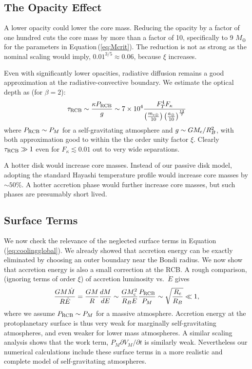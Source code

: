 \documentclass[apj]{emulateapj}
\newcommand{\p}{\partial}
\newcommand{\Eq}[1]{Equation\,(\ref{#1})}
\newcommand{\co}{_{\rm c}}
\newcommand{\cb}{_{\rm RCB}}
\newcommand{\surf}{_M}
\newcommand{\mc}{m_{\rm c \oplus}}
\newcommand{\au}{a_\oplus}
\begin{document}
\subsection{The Opacity Effect}
A  lower opacity  could lower the core mass.  Reducing the opacity by a factor of one hundred cuts the core mass by more than a factor of 10, specifically to 9 $M_\oplus$ for the parameters in \Eq{eq:Mcrit}.  The reduction is not  as strong as the nominal scaling would imply, $0.01^{3/5} \approx 0.06$, because $\xi$ increases.

Even with significantly lower opacities, radiative diffusion remains a good approximation at the radiative-convective boundary.  We estimate the optical depth as (for $\beta = 2$):
\begin{equation}
\tau\cb \sim {\kappa P\cb \over g} \sim 7 \times 10^4 {F_T^4 F_\kappa \over \left(\mc \over 10 \right) \left(\au \over 10\right)^{12 \over 7}} 
\end{equation} 
where $P\cb \sim P_M$ for a self-gravitating atmosphere and $g \sim G M\co/R_B^2$, with both approximation good to within the the order unity factor $\xi$.  Clearly $\tau\cb \gg 1$ even for $F_\kappa \lesssim 0.01$ out to very wide separations.

A hotter disk would increase core masses.  Instead of our passive disk model, adopting the standard Hayashi temperature profile would increase core masses by $\sim 50\%$.  A hotter accretion phase would further increase core masses, but such phases are presumably short lived.

\subsection{Surface Terms}
We now check the relevance of the neglected surface terms in \Eq{eq:coolingglobal}.  We already showed that accretion energy can be exactly eliminated by choosing an outer boundary near the Bondi radius.   We now show that accretion energy is also a small correction at the RCB.   A rough comparison, (ignoring terms of order $\xi$) of  accretion luminosity vs.\ $\dot{E}$ gives
\begin{equation}
{G M \dot{M} \over R \dot{E}} = {G M  \over R}{dM \over dE} \sim {G M\co^2 \over R_B E}{P\cb \over P_M} \sim \sqrt{R\co \over R_B} \ll 1,
\end{equation} 
where we assume $P\cb \sim P_M$  for a massive atmosphere.  Accretion energy at the protoplanetary surface is thus very weak for marginally self-gravitating atmospheres, and even weaker for lower mass atmospheres.  A similar scaling analysis shows that the work term, $P\surf \p V\surf/\p t$ is similarly weak.  Nevertheless our numerical calculations include these surface terms in a more realistic and complete model of self-gravitating atmospheres.
\end{document}
